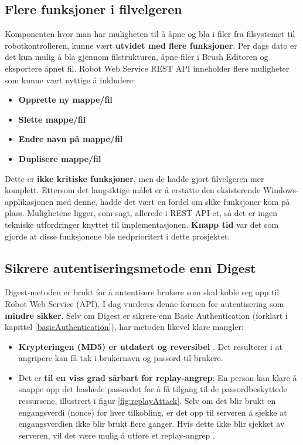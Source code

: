 \subsection{Flere funksjoner i filvelgeren}
Komponenten hvor man har muligheten til å åpne og bla i filer fra filsystemet til robotkontrolleren, kunne vært \textbf{utvidet med flere funksjoner}. Per dags dato er det kun mulig å bla gjennom filstrukturen, åpne filer i Brush Editoren og eksportere åpnet fil. Robot Web Service REST API inneholder flere muligheter som kunne vært nyttige å inkludere:

\begin{itemize}
    \item \textbf{Opprette ny mappe/fil}
    \item \textbf{Slette mappe/fil}
    \item \textbf{Endre navn på mappe/fil}
    \item \textbf{Duplisere mappe/fil}
\end{itemize}

\noindent Dette er \textbf{ikke kritiske funksjoner}, men de hadde gjort filvelgeren mer komplett. Ettersom det langsiktige målet er å erstatte den eksisterende Windows-applikasjonen med denne, hadde det vært en fordel om slike funksjoner kom på plass. Mulighetene ligger, som sagt, allerede i REST API-et, så det er ingen tekniske utfordringer knyttet til implementasjonen. \textbf{Knapp tid} var det som gjorde at disse funksjonene ble nedprioritert i dette prosjektet.

\subsection{Sikrere autentiseringsmetode enn Digest}
Digest-metoden er brukt for å autentisere brukere som skal koble seg opp til Robot Web Service (API). I dag vurderes denne formen for autentisering som \textbf{mindre sikker}. Selv om Digest er sikrere enn Basic Authentication (forklart i kapittel \ref{basicAuthentication}), har metoden likevel klare mangler:

\begin{itemize}
\item \textbf{Krypteringen (MD5) er utdatert og reversibel} \cite{md5_outdated}. Det resulterer i at angripere kan få tak i brukernavn og passord til brukere.
\item Det er \textbf{til en viss grad sårbart for replay-angrep}: En person kan klare å snappe opp det hashede passordet for å få tilgang til de passordbeskyttede ressursene, illustrert i figur \ref{fig:replayAttack}. Selv om det blir brukt en engangsverdi (nonce) for hver tilkobling, er det opp til serveren å sjekke at engangsverdien ikke blir brukt flere ganger. Hvis dette ikke blir sjekket av serveren, vil det være mulig å utføre et replay-angrep \cite{replayAttack}.
\end{itemize}

